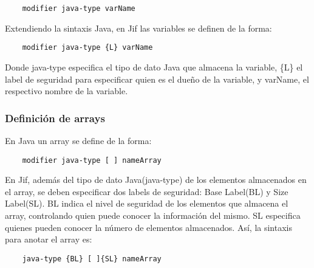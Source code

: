 \begin{lstlisting}
	modifier java-type varName
\end{lstlisting}
Extendiendo la sintaxis Java, en Jif las variables se definen de la forma:
\begin{lstlisting}
	modifier java-type {L} varName
\end{lstlisting}
Donde java-type especifica el tipo de dato Java que almacena la variable, \{L\}
el label de seguridad  para especificar quien es el dueño de la variable, y
varName, el respectivo nombre de la variable.

\subsubsection{Definición de arrays}
En Java un array se define de la forma:
\begin{lstlisting}
	modifier java-type [ ] nameArray
\end{lstlisting}
En Jif, además del tipo de dato Java(java-type) de los elementos almacenados en
el array, se deben especificar dos labels de seguridad: Base Label(BL) y Size
Label(SL). BL indica el nivel de seguridad de los elementos que almacena el
array, controlando quien puede conocer la información del mismo. SL especifica
quienes pueden conocer la número de elementos almacenados. Así, la sintaxis para
anotar el array es:
\begin{lstlisting}
	java-type {BL} [ ]{SL} nameArray
\end{lstlisting}

